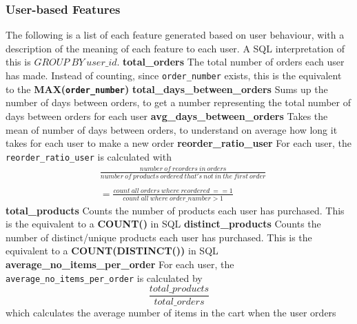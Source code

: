 \documentclass[12pt]{article}
\begin{document}
\subsubsection{User-based Features} \label{user_features}
The following is a list of each feature generated based on user behaviour, with a description of the meaning of each feature to each user. A SQL interpretation of this is $GROUP\ BY\ user\_id$.
\newline
\newline
{\textbf{total\_orders}}
\newline
The total number of orders each user has made. Instead of counting, since \texttt{order\_number} exists, this is the equivalent to the \textbf{MAX(\texttt{order\_number})}
\newline
\newline
{\textbf{total\_days\_between\_orders}}
\newline
Sums up the number of days between orders, to get a number representing the total number of days between orders for each user
\newline
\newline
{\textbf{avg\_days\_between\_orders}}
\newline
Takes the mean of number of days between orders, to understand on average how long it takes for each user to make a new order
\newline
\newline
{\textbf{reorder\_ratio\_user}}
\newline
For each user, the \texttt{reorder\_ratio\_user} is calculated with
\begin{equation}
    \begin{split}
    &\frac{number\ of\ reorders\ in\ orders}{number\ of\ products\ ordered\ that's\ not\ in\ the\ first\ order} \\ \\
    &= \frac{count\ all\ orders\ where\ reordered\ == 1}{count\ all\ where\ order\_ number > 1}
    \end{split}
\end{equation}
\newline
\newline
{\textbf{total\_products}}
\newline
Counts the number of products each user has purchased. This is the equivalent to a \textbf{COUNT()} in SQL
\newline
\newline
{\textbf{distinct\_products}}
\newline
Counts the number of distinct/unique products each user has purchased. This is the equivalent to a \textbf{COUNT(DISTINCT())} in SQL
\newline
\newline
{\textbf{average\_no\_items\_per\_order}}
\newline
For each user, the \texttt{average\_no\_items\_per\_order} is calculated by
\begin{equation}
    \frac
    {total\_products}
    {total\_orders}
\end{equation}
which calculates the average number of items in the cart when the user orders
\newline
\newline
\end{document}
